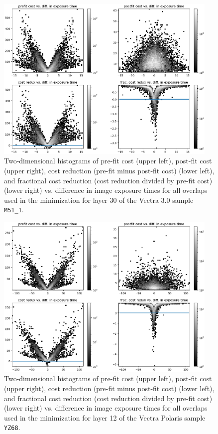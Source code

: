 \documentclass[letterpaper,11pt]{article}
\begin{document}
\begin{figure}[!ht]
\centering
\includegraphics[width=0.95\textwidth]{images/methods/cost_reduction_plots_2d_M51_1_layer_30}
\caption{\footnotesize Two-dimensional histograms of pre-fit cost (upper left), post-fit cost (upper right), cost reduction (pre-fit minus post-fit cost) (lower left), and fractional cost reduction (cost reduction divided by pre-fit cost) (lower right) vs. difference in image exposure times for all overlaps used in the minimization for layer 30 of the Vectra 3.0 sample \texttt{M51\_1}.}
\label{fig:cost_reduction_plots_M51_1_layer_30}
\end{figure}

\begin{figure}[!ht]
\centering
\includegraphics[width=0.95\textwidth]{images/methods/cost_reduction_plots_2d_YZ68_layer_12}
\caption{\footnotesize Two-dimensional histograms of pre-fit cost (upper left), post-fit cost (upper right), cost reduction (pre-fit minus post-fit cost) (lower left), and fractional cost reduction (cost reduction divided by pre-fit cost) (lower right) vs. difference in image exposure times for all overlaps used in the minimization for layer 12 of the Vectra Polaris sample \texttt{YZ68}.}
\label{fig:cost_reduction_plots_YZ68_layer_12}
\end{figure}
\end{document}

